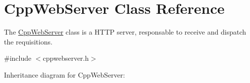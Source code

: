 \hypertarget{class_cpp_web_server}{}\section{Cpp\+Web\+Server Class Reference}
\label{class_cpp_web_server}


The \hyperlink{class_cpp_web_server}{Cpp\+Web\+Server} class is a H\+T\+TP server, responsable to receive and dispatch the requisitions.  




{\ttfamily \#include $<$cppwebserver.\+h$>$}



Inheritance diagram for Cpp\+Web\+Server\+:
